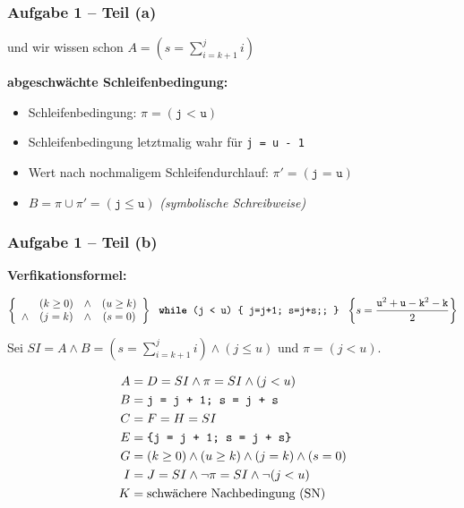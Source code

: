\documentclass{beamer}
\renewcommand{\emph}[1]{\textbf{#1}}
\begin{document}
\begin{frame} \frametitle{Aufgabe 1 -- Teil (a)}
	 und wir wissen schon $A = (s = \sum\limits_{i = k+1}^j i)$
	
	\bigskip
	
	\textbf{abgeschwächte Schleifenbedingung:}
	\begin{itemize}
		\item Schleifenbedingung: $\pi = (\texttt{j < u})$
		\item Schleifenbedingung letztmalig wahr für \texttt{j = u - 1}
		\item Wert nach nochmaligem Schleifendurchlauf: $\pi' = (\texttt{j = u})$
		\item $B = \pi \cup \pi' = (\texttt{j} \le \texttt{u})$ \hspace{1cm} {\footnotesize \itshape (symbolische Schreibweise)}
	\end{itemize}
	\medskip
	
\end{frame}


\begin{frame} \frametitle{Aufgabe 1 -- Teil (b)}
	\small
	
	\begin{center}
		\emph{Verfikationsformel:} 
		\begin{scriptsize}
			\setlength\arraycolsep{1pt}
			\begin{equation*}
				\left\{ \begin{array}{cccc}
						& (k \ge 0) &\land& (u \ge k) \\
						\land & (j = k)   &\land& (s = 0)
					\end{array}
					\right\} \ \ \texttt{\emph{while} (\texttt{j} < \texttt{u}) \{ \texttt{j=j+1; s=j+s;}; \}} \ \ \left\{
					s = \frac{\texttt{u}^2 + \texttt{u} - \texttt{k}^2 - \texttt{k}}{2}
					\right\}
			\end{equation*}
		\end{scriptsize}
	\end{center}
	
	\bigskip \pause
	
	Sei $SI = A \land B = \left( s = \sum\limits_{i = k+1}^j i \right) \land (j \le u)$ und $\pi = (j < u)$.
	
	
	\begin{align*}
		A &= D = SI \land \pi = SI \land (j < u) \\
		B &= \texttt{j = j + 1; s = j + s} \\
		C &= F = H = SI \\
		E &= \texttt{\{\texttt{j = j + 1; s = j + s}\}} \\
		G &= (k \ge 0) \land (u \ge k) \land (j = k) \land (s = 0) \\
		I &= J = SI \land \lnot \pi = SI \land \lnot (j < u) \\
		K &= \text{schwächere Nachbedingung (SN)}
	\end{align*}
\end{frame}
\end{document}
